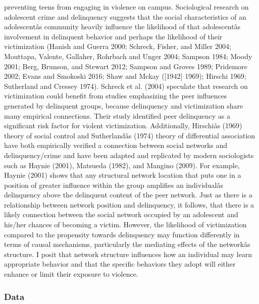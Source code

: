 \documentclass[]{article}
\begin{document}
\begin{enumerate}
  preventing teens from engaging in violence on campus. Sociological
  research on adolescent crime and delinquency suggests that the social
  characteristics of an adolescentâs community heavily influence the
  likelihood of that adolescentâs involvement in delinquent behavior
  and perhaps the likelihood of their victimization (Hanish and Guerra
  2000; Schreck, Fisher, and Miller 2004; Mouttapa, Valente, Gallaher,
  Rohrbach and Unger 2004; Sampson 1984; Moody 2001; Berg, Brunson, and
  Stewart 2012; Sampson and Groves 1989; Pridemore 2002; Evans and
  Smokoski 2016; Shaw and Mckay ({[}1942{]} 1969); Hirschi 1969;
  Sutherland and Cressey 1974). Schreck et al. (2004) speculate that
  research on victimization could benefit from studies emphasizing the
  peer influences generated by delinquent groups, because delinquency
  and victimization share many empirical connections. Their study
  identified peer delinquency as a significant risk factor for violent
  victimization. Additionally, Hirschiâs (1969) theory of social
  control and Sutherlandâs (1974) theory of differential association
  have both empirically verified a connection between social networks
  and delinquency/crime and have been adapted and replicated by modern
  sociologists such as Haynie (2001), Matsueda (1982), and Mangino
  (2009). For example, Haynie (2001) shows that any structural network
  location that puts one in a position of greater influence within the
  group amplifies an individualâs delinquency above the delinquent
  content of the peer network. Just as there is a relationship between
  network position and delinquency, it follows, that there is a likely
  connection between the social network occupied by an adolescent and
  his/her chances of becoming a victim. However, the likelihood of
  victimization compared to the propensity towards delinquency may
  function differently in terms of causal mechanisms, particularly the
  mediating effects of the networkâs structure. I posit that network
  structure influences how an individual may learn appropriate behavior
  and that the specific behaviors they adopt will either enhance or
  limit their exposure to violence.
\end{enumerate}

\subsubsection{Data}\label{data}
\end{document}
